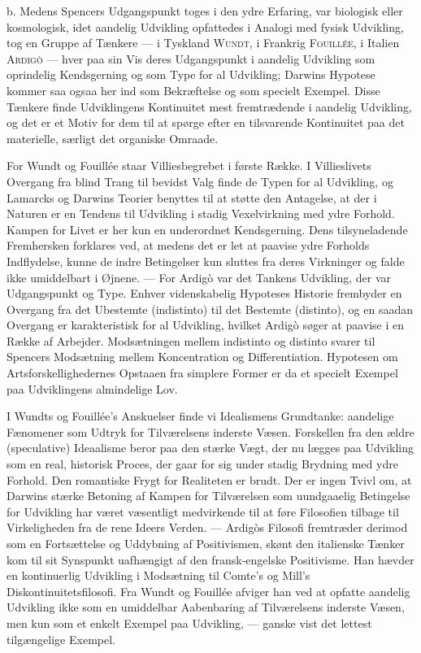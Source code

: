 \documentclass[12pt,a4paper,openany]{book}
\newcommand{\opage}[1]{\marginnote{\footnotesize\textit{[#1]}}}
\begin{document}
b. Medens Spencers Udgangspunkt toges i den ydre Erfaring,
var biologisk eller kosmologisk, idet aandelig Udvikling
opfattedes i Analogi med fysisk Udvikling, tog en Gruppe af
Tænkere --- i Tyskland \textsc{Wundt}, i Frankrig \textsc{Fouillée}, i Italien
\textsc{Ardigò} --- hver paa sin Vis deres Udgangspunkt i aandelig
Udvikling som oprindelig Kendsgerning og som Type for al
Udvikling; Darwins Hypotese kommer saa ogsaa her ind som
Bekræftelse og som specielt Exempel. Disse Tænkere finde
Udviklingens Kontinuitet mest fremtrædende i aandelig Udvikling,
og det er et Motiv for dem til at spørge efter en tilsvarende
Kontinuitet paa det materielle, særligt det organiske
Omraade.

For Wundt og Fouillée staar Villiesbegrebet i første Række.
I Villieslivets Overgang fra blind Trang til bevidst Valg finde
de Typen for al Udvikling, og Lamarcks og Darwins Teorier
\setcounter{footnote}{0}%
\opage{213}benyttes til at støtte den Antagelse, at der i Naturen er en
Tendens til Udvikling i stadig Vexelvirkning med ydre Forhold.
Kampen for Livet er her kun en underordnet Kendsgerning.
Dens tilsyneladende Fremhersken forklares ved, at medens det
er let at paavise ydre Forholds Indflydelse, kunne de indre Betingelser
kun sluttes fra deres Virkninger og falde ikke umiddelbart
i Øjnene. --- For Ardigò var det Tankens Udvikling, der
var Udgangspunkt og Type. Enhver videnskabelig Hypoteses
Historie frembyder en Overgang fra det Ubestemte (indistinto)
til det Bestemte (distinto), og en saadan Overgang er karakteristisk
for al Udvikling, hvilket Ardigò søger at paavise i en
Række af Arbejder. Modsætningen mellem indistinto og distinto
svarer til Spencers Modsætning mellem Koncentration og
Differentiation. Hypotesen om Artsforskellighedernes Opstaaen
fra simplere Former er da et specielt Exempel paa Udviklingens
almindelige Lov.

I Wundts og Fouillée’s Anskuelser finde vi Idealismens
Grundtanke: aandelige Fænomener som Udtryk for Tilværelsens
inderste Væsen. Forskellen fra den ældre (speculative) Ideaalisme
beror paa den stærke Vægt, der nu lægges paa Udvikling
som en real, historisk Proces, der gaar for sig under stadig
Brydning med ydre Forhold. Den romantiske Frygt for
Realiteten er brudt. Der er ingen Tvivl om, at Darwins stærke
Betoning af Kampen for Tilværelsen som uundgaaelig Betingelse
for Udvikling har været væsentligt medvirkende til at føre
Filosofien tilbage til Virkeligheden fra de rene Ideers Verden.
--- Ardigòs Filosofi fremtræder derimod som en Fortsættelse
og Uddybning af Positivismen, skønt den italienske Tænker
kom til sit Synspunkt uafhængigt af den fransk-engelske Positivisme.
Han hævder en kontinuerlig Udvikling i Modsætning
til Comte’s og Mill’s Diskontinuitetsfilosofi. Fra Wundt og
Fouillée afviger han ved at opfatte aandelig Udvikling ikke
som en umiddelbar Aabenbaring af Tilværelsens inderste Væsen,
men kun som et enkelt Exempel paa Udvikling, --- ganske
vist det lettest tilgængelige Exempel.
\end{document}
